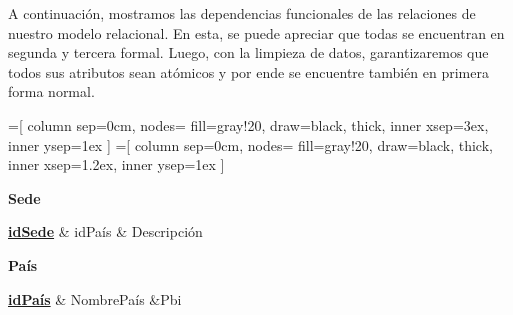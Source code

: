 \documentclass[10pt,a4paper]{article}
\begin{document}
A continuación, mostramos las dependencias funcionales de las relaciones de nuestro modelo relacional. En esta, se puede apreciar que 
todas se encuentran en segunda y tercera formal. Luego, con la limpieza de datos, garantizaremos que todos sus atributos sean atómicos
y por ende se encuentre también en primera forma normal.  \vspace{0.3cm}

=[%
    column sep=0cm, %
    nodes={%
        fill=gray!20,
        draw=black,
        thick,
        inner xsep=3ex,
        inner ysep=1ex
    }
]
=[%
    column sep=0cm, %
    nodes={%
        fill=gray!20,
        draw=black,
        thick,
        inner xsep=1.2ex,
        inner ysep=1ex
    }
]


\textbf{Sede} \vspace{0.1cm}

\begin{dependency}
    \raggedright
    \begin{deptext}[TxtBookChico] %
        \textbf{\underline{idSede}}  \& idPaís \& Descripción\\
    \end{deptext}
\end{dependency} \vspace{0.3cm}
 \vspace{0.3cm}

\textbf{País} 
\vspace{0.1cm}

\begin{dependency}
    \raggedright
    \begin{deptext}[TxtBook] %
        \textbf{\underline{idPaís}}  \& NombrePaís \&Pbi \\
    \end{deptext}
\end{dependency} \vspace{0.3cm}
\end{document}

